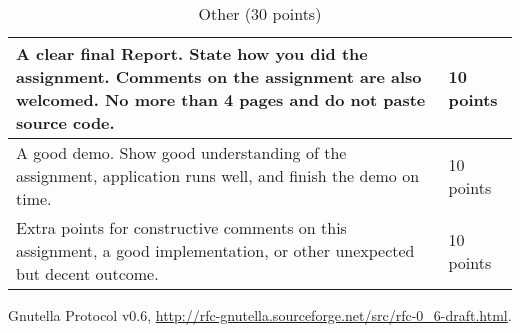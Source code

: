 \documentclass[12pt, a4paper]{article}
\begin{document}
\begin{table}[htdp]
\caption{Other (30 points)}
\begin{center}
\begin{tabular}{|p{12cm}|p{2cm}|}
\hline
A clear final Report.
State how you did the assignment.
Comments on the assignment are also welcomed.
No more than 4 pages and do not paste source code. & 10 points \\
\hline
A good demo.
Show good understanding of the assignment, application runs well, and finish the demo on time. & 10 points \\
\hline
Extra points for constructive comments on this assignment, a good implementation, or other unexpected but decent outcome. & 10 points \\

\hline
\end{tabular}
\end{center}
\end{table}


\FloatBarrier

\begin{thebibliography}{1}

Gnutella Protocol v0.6, \url{http://rfc-gnutella.sourceforge.net/src/rfc-0\_6-draft.html}.

\end{thebibliography}
\end{document}
